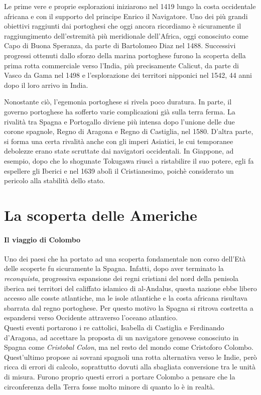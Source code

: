 \documentclass[11pt]{report}
\begin{document}
	Le prime vere e proprie esplorazioni iniziarono nel 1419 lungo la costa occidentale africana e con il supporto del principe Enrico il Navigatore. Uno dei più grandi obiettivi raggiunti dai portoghesi che oggi ancora ricordiamo è sicuramente il raggiungimento dell'estremità più meridionale dell'Africa, oggi conosciuto come Capo di Buona Speranza, da parte di Bartolomeo Diaz nel 1488. Successivi progressi ottenuti dallo sforzo della marina portoghese furono la scoperta della prima rotta commerciale verso l'India, più precisamente Calicut, da parte di Vasco da Gama nel 1498 e l'esplorazione dei territori nipponici nel 1542, 44 anni dopo il loro arrivo in India.
	
	Nonostante ciò, l'egemonia portoghese si rivela poco duratura. In parte, il governo portoghese ha sofferto varie complicazioni già sulla terra ferma. La rivalità tra Spagna e Portogallo diviene più intensa dopo l'unione delle due corone spagnole, Regno di Aragona e Regno di Castiglia, nel 1580. D'altra parte, si forma una certa rivalità anche con gli imperi Asiatici, le cui temporanee debolezze erano state scruttate dai navigatori occidentali. In Giappone, ad esempio, dopo che lo shogunate Tokugawa riuscì a ristabilire il suo potere, egli fa espellere gli Iberici e nel 1639 abolì il Cristianesimo, poichè considerato un pericolo alla stabilità dello stato. \cite{o2005philip}
	
	\section*{La scoperta delle Americhe}
	
	\paragraph*{Il viaggio di Colombo}
	
	Uno dei paesi che ha portato ad una scoperta fondamentale non corso dell'Età delle scoperte fu sicuramente la Spagna. Infatti, dopo aver terminato la \textit{reconquista}, progressiva espansione dei regni cristiani del nord della penisola iberica nei territori del califfato islamico di al-Andalus, questa nazione ebbe libero accesso alle cosste atlantiche, ma le isole atlantiche e la costa africana risultava sbarrata dal regno portoghese. Per questo motivo la Spagna si ritrova costretta a espandersi verso Occidente attraverso l'oceano atlantico.\\
	
	Questi eventi portarono i re cattolici, Isabella di Castiglia e Ferdinando d'Aragona, ad accettare la proposta di un navigatore genovese conosciuto in Spagna come \textit{Cristobal Colon}, ma nel resto del mondo come Cristoforo Colombo. Quest'ultimo propose ai sovrani spagnoli una rotta alternativa verso le Indie, però ricca di errori di calcolo, soprattutto dovuti alla sbagliata conversione tra le unità di misura. Furono proprio questi errori a portare Colombo a pensare che la circonferenza della Terra fosse molto minore di quanto lo è in realtà.
	
\end{document}
